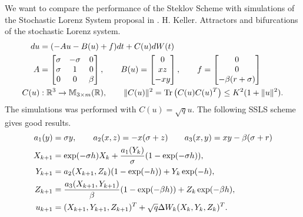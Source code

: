 
	We want to compare the performance of the Steklov Scheme with simulations of the Stochastic
Lorenz System proposal in \cite{Keller1996}.
H. Keller. Attractors and bifurcations of the stochastic Lorenz system.
\begin{align}
	du &= (-Au - B(u) + f)dt +C(u)dW(t) \notag\\
	A & = 
	\begin{bmatrix}
		\sigma	&-\sigma	&0\\
		\sigma	&1			&0\\
		0		&0			&\beta
	\end{bmatrix}, 
	\qquad
	B(u) = 
	\begin{bmatrix}
		0\\
		xz\\
		-xy
	\end{bmatrix},
	\qquad
	f=
	\begin{bmatrix}
		0\\
		0\\
		-\beta(r+\sigma)
	\end{bmatrix} \label{eqn:LorenzSDE}\\
	C(u) &: \mathbb{R}^3 \to \mathbb{M}_{3 \times m}(\mathbb{R}), \qquad
	\|C(u)\|^2 = \operatorname{Tr}\left(C(u)C(u)^T\right)\leq K^2(1+ \|u\|^2).
	\notag
\end{align}
The simulations was performed with $C(u)=\sqrt{q}u$.
The following SSLS scheme gives good results.
\begin{align}
	a_1(y) &= \sigma y, \qquad a_2(x,z) = -x (\sigma +z) \qquad 
	a_3(x,y) = x y -\beta(\sigma +r) \notag\\
	X_{k+1} &= \exp(-\sigma h) X_{k}
		+\frac{a_1(Y_k)}{\sigma}
		(1-\exp(-\sigma h)), \notag\\
	Y_{k+1} &= a_2(X_{k+1},Z_{k}) (1-\exp(-h))
		+Y_k \exp(-h), \label{eqn:LorenzSSLS}\\
	Z_{k+1} &= \frac{a_3(X_{k+1}, Y_{k+1})}{\beta} (1- \exp(-\beta h))
		+Z_{k} \exp(-\beta h), \notag\\
	u_{k+1} &= (X_{k+1},Y_{k+1},Z_{k+1})^T + \sqrt{q} \Delta W_k (X_{k},Y_{k},Z_{k})^T.
	\notag
\end{align}

